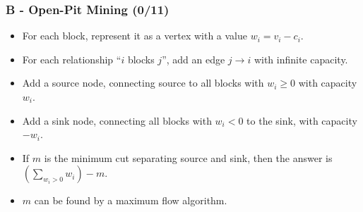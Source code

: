 \documentclass{beamer}
\begin{document}
\begin{frame}
\frametitle{B - Open-Pit Mining (0/11)}
\begin{itemize}
\setlength\itemsep{0.5\baselineskip}
\item For each block, represent it as a vertex with a value $w_i = v_i - c_i$.
\item For each relationship ``$i$ blocks $j$'', add an edge $j \rightarrow i$
  with infinite capacity.
\item Add a source node, connecting source to all blocks with $w_i \geq 0$ with
  capacity $w_i$.
\item Add a sink node, connecting all blocks with $w_i < 0$ to the sink, with
  capacity $-w_i$.
\item If $m$ is the minimum cut separating source and sink, then the answer
  is $\left(\sum_{w_i > 0} w_i\right) - m$.
\item $m$ can be found by a maximum flow algorithm.
\end{itemize}
\end{frame}
\end{document}
